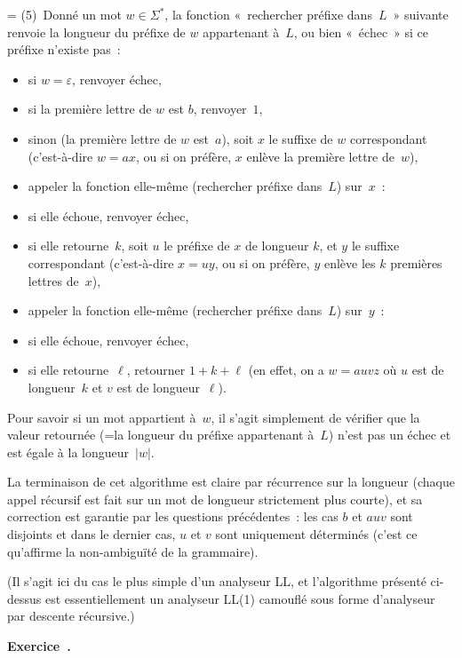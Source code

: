 \documentclass[12pt,a4paper]{article}
\theoremstyle{definition}
\newcommand\exercice{%
\refstepcounter{comcnt}\bigskip\noindent\textbf{Exercice~\thecomcnt.}}
\newif\ifcorrige
\newenvironment{corrige}%
{\ifcorrige\relax\else\setbox0=\vbox\bgroup\fi%
\smallbreak\footnotesize\noindent{\underbar{\textit{Corrigé.}}\quad}}
{{\hbox{}\nobreak\hfill\checkmark}%
\ifcorrige\relax\else\egroup\fi\par}
\begin{document}
\begin{corrige}
(5) Donné un mot $w\in\Sigma^*$, la fonction « rechercher préfixe
  dans $L$ » suivante renvoie la longueur du préfixe de $w$
appartenant à $L$, ou bien « échec » si ce préfixe n'existe pas :
\begin{itemize}
\item si $w=\varepsilon$, renvoyer échec,
\item si la première lettre de $w$ est $b$, renvoyer $1$,
\item sinon (la première lettre de $w$ est $a$), soit $x$ le suffixe
  de $w$ correspondant (c'est-à-dire $w = ax$, ou si on préfère, $x$
  enlève la première lettre de $w$),
\item appeler la fonction elle-même (rechercher préfixe dans $L$)
  sur $x$ :
\item si elle échoue, renvoyer échec,
\item si elle retourne $k$, soit $u$ le préfixe de $x$ de longueur
  $k$, et $y$ le suffixe correspondant (c'est-à-dire $x = uy$, ou si
  on préfère, $y$ enlève les $k$ premières lettres de $x$),
\item appeler la fonction elle-même (rechercher préfixe dans $L$)
  sur $y$ :
\item si elle échoue, renvoyer échec,
\item si elle retourne $\ell$, retourner $1+k+\ell$ (en effet, on a $w
  = auvz$ où $u$ est de longueur $k$ et $v$ est de longueur $\ell$).
\end{itemize}

Pour savoir si un mot appartient à $w$, il s'agit simplement de
vérifier que la valeur retournée (=la longueur du préfixe appartenant
à $L$) n'est pas un échec et est égale à la longueur $|w|$.

La terminaison de cet algorithme est claire par récurrence sur la
longueur (chaque appel récursif est fait sur un mot de longueur
strictement plus courte), et sa correction est garantie par les
questions précédentes : les cas $b$ et $auv$ sont disjoints et dans le
dernier cas, $u$ et $v$ sont uniquement déterminés (c'est ce
qu'affirme la non-ambiguïté de la grammaire).

(Il s'agit ici du cas le plus simple d'un analyseur LL, et
l'algorithme présenté ci-dessus est essentiellement un analyseur LL(1)
camouflé sous forme d'analyseur par descente récursive.)
\end{corrige}

%

\exercice
\end{document}
